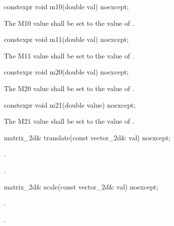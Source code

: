 \begin{itemdecl}
constexpr void m10(double val) noexcept;
\end{itemdecl}
\begin{itemdescr}
\pnum
\effects
The M10 value shall be set to the value of .
\end{itemdescr}

\begin{itemdecl}
constexpr void m11(double val) noexcept;
\end{itemdecl}
\begin{itemdescr}
\pnum
\effects
The M11 value shall be set to the value of .
\end{itemdescr}

\begin{itemdecl}
constexpr void m20(double val) noexcept;
\end{itemdecl}
\begin{itemdescr}
\pnum
\effects
The M20 value shall be set to the value of .
\end{itemdescr}

\begin{itemdecl}
constexpr void m21(double value) noexcept;
\end{itemdecl}
\begin{itemdescr}
\pnum
\effects
The M21 value shall be set to the value of .
\end{itemdescr}

\begin{itemdecl}
matrix_2d& translate(const vector_2d& val) noexcept;
\end{itemdecl}
\begin{itemdescr}
\pnum
\effects
{}.

\pnum
\returns
{}.
\end{itemdescr}

\begin{itemdecl}
matrix_2d& scale(const vector_2d& val) noexcept;
\end{itemdecl}
\begin{itemdescr}
\pnum
\effects
{}.

\pnum
\returns
{}.
\end{itemdescr}

